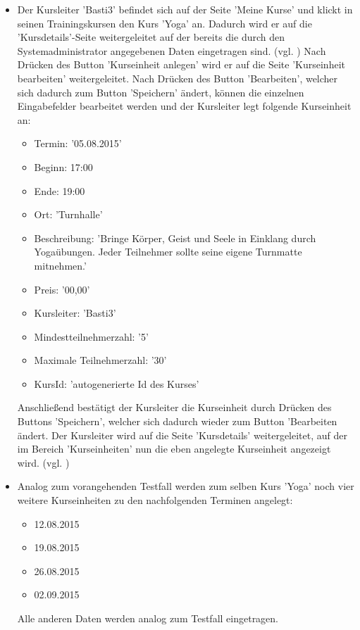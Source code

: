 \documentclass[a4paper]{scrreprt}
\begin{document}
\begin{itemize}
			\item {} 
			Der Kursleiter 'Basti3' befindet sich auf der Seite 'Meine Kurse' und klickt in seinen Trainingskursen den Kurs 'Yoga' an. Dadurch wird er auf die 'Kursdetails'-Seite weitergeleitet auf der bereits die durch den Systemadministrator angegebenen Daten eingetragen sind. (vgl. ) Nach Drücken des Button 'Kurseinheit anlegen' wird er auf die Seite 'Kurseinheit bearbeiten' weitergeleitet. Nach Drücken des Button 'Bearbeiten', welcher sich dadurch zum Button 'Speichern' ändert, können die einzelnen Eingabefelder bearbeitet werden und der Kursleiter legt folgende Kurseinheit an:
			\begin{itemize}
				\item Termin: '05.08.2015'
				\item Beginn: 17:00
				\item Ende: 19:00
				\item Ort: 'Turnhalle'
				\item Beschreibung: 'Bringe Körper, Geist und Seele in Einklang durch Yogaübungen. Jeder Teilnehmer sollte seine eigene Turnmatte mitnehmen.'
				\item Preis: '00,00'
				\item Kursleiter: 'Basti3'
				\item Mindestteilnehmerzahl: '5'
				\item Maximale Teilnehmerzahl: '30'
				\item KursId: 'autogenerierte Id des Kurses'
			\end{itemize}	
			Anschließend bestätigt der Kursleiter die Kurseinheit durch Drücken des Buttons 'Speichern', welcher sich dadurch wieder zum Button 'Bearbeiten ändert. Der Kursleiter wird auf die Seite 'Kursdetails' weitergeleitet, auf der im Bereich 'Kurseinheiten' nun die eben angelegte Kurseinheit angezeigt wird. (vgl. )
			
			\item {} 
			Analog zum vorangehenden Testfall  werden zum selben Kurs 'Yoga' noch vier weitere Kurseinheiten zu den nachfolgenden Terminen angelegt:
			\begin{itemize}
				\item 12.08.2015
				\item 19.08.2015
				\item 26.08.2015
				\item 02.09.2015
			\end{itemize}		
			Alle anderen Daten werden analog zum Testfall  eingetragen.
			

\end{itemize}
\end{document}
